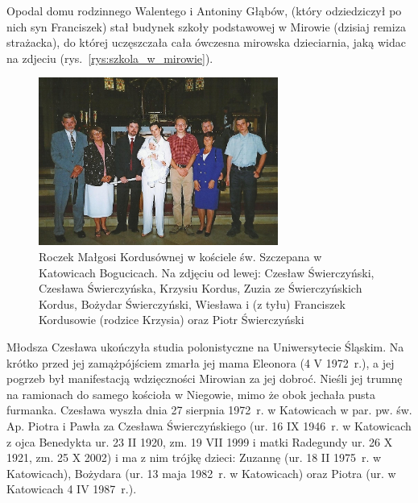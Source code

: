 
Opodal domu rodzinnego Walentego i Antoniny Głąbów, (który odziedziczył po nich syn Franciszek) stał budynek szkoły podstawowej w Mirowie (dzisiaj remiza strażacka), do której uczęszczała cała ówczesna mirowska dzieciarnia, jaką widac na zdjeciu (rys.~\ref{rys:szkola_w_mirowie}).

\begin{figure}[!h]
\begin{center}
\includegraphics[width=0.7\textwidth]{zdjecia/roczek_malgorzaty_kordus.jpg}
\caption[Roczek Małgorzaty Kordus]{Roczek Małgosi Kordusównej w kościele św. Szczepana w Katowicach Bogucicach. Na zdjęciu od lewej: Czesław Świerczyński, Czesława Świerczyńska, Krzysiu Kordus, Zuzia ze Świerczyńskich Kordus, Bożydar Świerczyński, Wiesława i (z tyłu) Franciszek Kordusowie (rodzice Krzysia) oraz Piotr Świerczyński}
\label{rys:roczek_malgorzaty_kordus}
\end{center}
\end{figure}

Młodsza Czesława ukończyła studia polonistyczne na Uniwersytecie Śląskim. Na krótko przed jej zamążpójściem zmarła jej mama Eleonora (4 V 1972~r.), a jej pogrzeb był manifestacją wdzięczności Mirowian za jej dobroć. Nieśli jej trumnę na ramionach do samego kościoła w Niegowie, mimo że obok jechała pusta furmanka. Czesława wyszła dnia 27 sierpnia 1972~r.  w Katowicach w par. pw. św. Ap. Piotra i Pawła za Czesława Świerczyńskiego (ur. 16 IX 1946~r. w Katowicach z ojca Benedykta ur. 23 II 1920, zm. 19 VII 1999 i matki Radegundy ur. 26 X 1921, zm. 25 X 2002) i ma z nim trójkę dzieci: Zuzannę (ur. 18 II 1975~r. w Katowicach), Bożydara (ur. 13 maja 1982~r. w Katowicach) oraz Piotra (ur. w Katowicach 4 IV 1987~r.).

